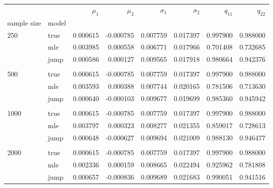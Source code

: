 \begin{tabular}{llrrrrrr}
\toprule
     &      &   $\mu_1$ &   $\mu_2$ &  $\sigma_1$ &  $\sigma_2$ &    $q_{11}$ &    $q_{22}$ \\
sample size & model &           &           &             &             &           &           \\
\midrule
250  & true &  0.000615 & -0.000785 &    0.007759 &    0.017397 &  0.997900 &  0.988000 \\
     & mle &  0.003985 &  0.000558 &    0.006771 &    0.017966 &  0.701408 &  0.732685 \\
     & jump &  0.000586 &  0.000127 &    0.009565 &    0.017918 &  0.980664 &  0.942376 \\
     \\
500  & true &  0.000615 & -0.000785 &    0.007759 &    0.017397 &  0.997900 &  0.988000 \\
     & mle &  0.003593 &  0.000388 &    0.007744 &    0.020165 &  0.781506 &  0.713630 \\
     & jump &  0.000640 & -0.000103 &    0.009677 &    0.019699 &  0.985360 &  0.945942 \\
     \\
1000 & true &  0.000615 & -0.000785 &    0.007759 &    0.017397 &  0.997900 &  0.988000 \\
     & mle &  0.003797 &  0.000323 &    0.008277 &    0.021355 &  0.859017 &  0.728613 \\
     & jump &  0.000648 & -0.000627 &    0.009694 &    0.021009 &  0.988130 &  0.946477 \\
     \\
2000 & true &  0.000615 & -0.000785 &    0.007759 &    0.017397 &  0.997900 &  0.988000 \\
     & mle &  0.002336 &  0.000159 &    0.008665 &    0.022494 &  0.925962 &  0.781808 \\
     & jump &  0.000657 & -0.000836 &    0.009689 &    0.021683 &  0.990051 &  0.941516 \\
\bottomrule
\end{tabular}
